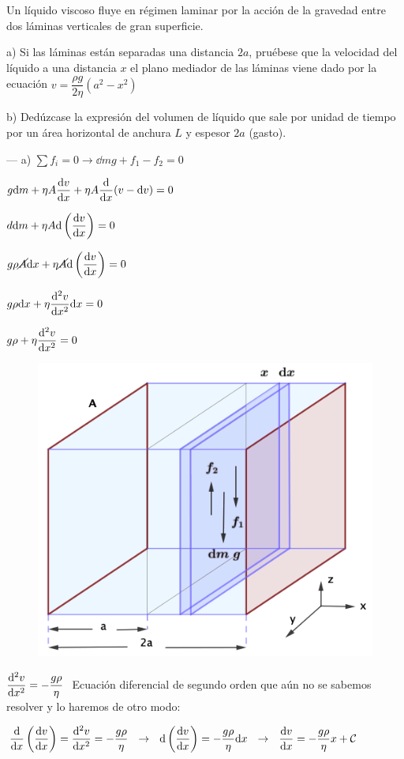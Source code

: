 \begin{prob}
Un líquido viscoso fluye en régimen laminar por la acción de la gravedad entre dos láminas verticales de gran superficie.

a) Si las láminas están separadas una distancia $2a$, pruébese que la velocidad del líquido a una distancia $x$ el plano mediador de las láminas viene dado por la ecuación $v=\dfrac{\rho g}{2 \eta}(a^2-x^2)$	

b) Dedúzcase la expresión del volumen de líquido que sale por unidad de tiempo por un área horizontal de anchura $L$ y espesor $2a$ (gasto).
\end{prob}
\begin{multicols}{2}
--- a) $\sum f_i=0 \to \dd m g+f_1-f_2=0$

$\displaystyle g\dd m +\eta A\dv{v}{x} + \eta A \dv{x} (v-\dd v)=0$

$\displaystyle d\dd m +\eta A \dd \left( \dv{v}{x} \right)=0$

$\displaystyle g \rho \cancel{A} \dd x + \eta \cancel{A} \dd \left( \dv{v}{x} \right)=0$

$\displaystyle g \rho  \dd x + \eta  \dv[2]{v}{x} \dd x=0$

$\displaystyle g \rho   + \eta  \dv[2]{v}{x}=0$
\begin{figure}[H]
	\centering
	\includegraphics[width=.55\textwidth]{imagenes/imagenes18/T18IM18.png}
	\end{figure}	
\end{multicols}

$\displaystyle \dv[2]{v}{x}=-\dfrac{g\rho}{\eta}\ $  Ecuación diferencial de segundo orden que aún no se sabemos resolver y lo haremos de otro modo:

$\displaystyle \dv{x} \left( \dv{v}{x} \right) =\dv[2]{v}{x}=-\dfrac{g\rho}{\eta} \ \ \to \ \  \dd  \left( \dv{v}{x} \right) = -\dfrac{g\rho}{\eta} \dd x \ \ \to \ \  \dv{v}{x}=-\dfrac{g\rho}{\eta} x + \mathcal C$

